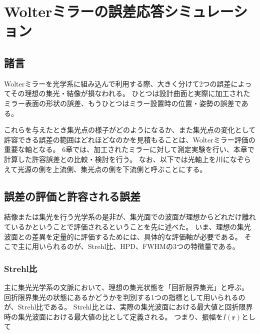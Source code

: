\chapter{Wolterミラーの誤差応答シミュレーション}
\thispagestyle{empty}
\label{chap2}
\graphicspath{{chap2/figure/}}
\minitoc

\newpage


\section{諸言}
\label{chap2_introduction}

Wolterミラーを光学系に組み込んで利用する際、大きく分けて2つの誤差によってその理想の集光・結像が損なわれる。
ひとつは設計曲面と実際に加工されたミラー表面の形状の誤差、もうひとつはミラー設置時の位置・姿勢の誤差である。

これらを与えたとき集光点の様子がどのようになるか、また集光点の変化として許容できる誤差の範囲はどれほどなのかを見積もることは、Wolterミラー評価の重要な軸となる。
6章では、加工されたミラーに対して測定実験を行い、本章で計算した許容誤差との比較・検討を行う。
なお、以下では光軸上を川になぞらえて光源の側を上流側、集光点の側を下流側と呼ぶことにする。

\clearpage
\newpage
\section{誤差の評価と許容される誤差}
\label{chap2_beam_evaluation_standard}

結像または集光を行う光学系の是非が、集光面での波面が理想からどれだけ離れているかということで評価されるということを先に述べた。
いま、理想の集光波面との差異を定量的に評価するためには、具体的な評価軸が必要である。
そこで主に用いられるのが、Strehl比、HPD、FWHMの3つの特徴量である。

\subsection{Strehl比}
\label{chap2_strehl_ratio}
主に集光光学系の文脈において、理想の集光状態を「回折限界集光」と呼ぶ。
回折限界集光の状態にあるかどうかを判別する1つの指標として用いられるのが、Strehl比である。
Strehl比とは、実際の集光波面における最大値と回折限界時の集光波面における最大値の比として定義される。
つまり、振幅を$I(\mathbf{r})$として

